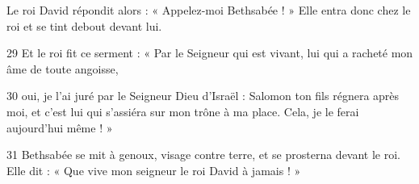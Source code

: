 Le roi David répondit alors : « Appelez-moi Bethsabée ! » Elle entra donc chez le roi et se tint debout devant lui.

29 Et le roi fit ce serment : « Par le Seigneur qui est vivant, lui qui a racheté mon âme de toute angoisse,

30 oui, je l’ai juré par le Seigneur Dieu d’Israël : Salomon ton fils régnera après moi, et c’est lui qui s’assiéra sur mon trône à ma place. Cela, je le ferai aujourd’hui même ! »

31 Bethsabée se mit à genoux, visage contre terre, et se prosterna devant le roi. Elle dit : « Que vive mon seigneur le roi David à jamais ! »
